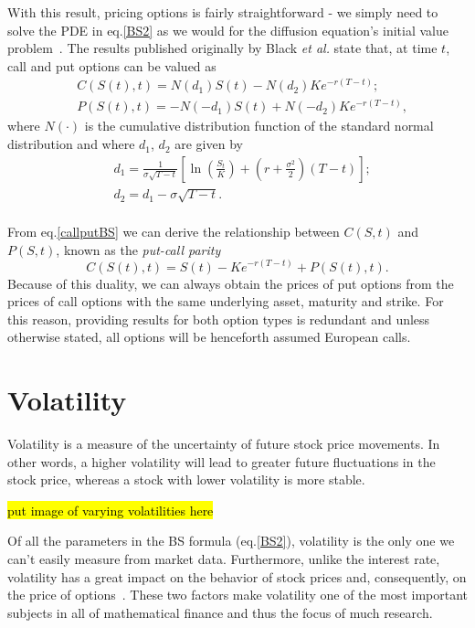 With this result, pricing options is fairly straightforward - we simply need to solve the PDE in eq.\eqref{BS2} as we would for the diffusion equation's initial value problem~\cite{Dilao}.
The results published originally by Black \textit{et al.} state that, at time $t$, call and put options can be valued as
\begin{equation}\label{callputBS}
\begin{split}
&C(S(t),t)=N(d_1)S(t)-N(d_2)Ke^{-r(T-t)};\\
&P(S(t),t)=-N(-d_1)S(t)+N(-d_2)Ke^{-r(T-t)},
\end{split}
\end{equation}
\noindent where $N(\cdot)$ is the cumulative distribution function of the standard normal distribution and where $d_1$, $d_2$ are given by
\begin{equation}\label{d1d2}
\begin{split}
&d_1=\frac{1}{\sigma\sqrt{T-t}}\left[\ln\left(\frac{S_t}{K}\right)+\left(r+\frac{\sigma^2}{2}\right)(T - t)\right];\\
&d_2=d_1-\sigma\sqrt{T-t}.\\
\end{split}
\end{equation}



From eq.\eqref{callputBS} we can derive the relationship between $C(S,t)$ and $P(S,t)$, known as the \emph{put-call parity}
\begin{equation}
C(S(t),t)=S(t)-Ke^{-r(T-t)}+P(S(t),t).
\end{equation}
\noindent Because of this duality, we can always obtain the prices of put options from the prices of call options with the same underlying asset, maturity and strike. For this reason, providing results for both option types is redundant and unless otherwise stated, all options will be henceforth assumed European calls.


\section{Volatility}
\label{section:volatility}
Volatility is a measure of the uncertainty of future stock price movements. In other words, a higher volatility will lead to greater future fluctuations in the stock price, whereas a stock with lower volatility is more stable.

\hl{put image of varying volatilities here}

Of all the parameters in the BS formula (eq.\eqref{BS2}), volatility is the only one we can't easily measure from market data.
Furthermore, unlike the interest rate, volatility has a great impact on the behavior of stock prices and, consequently, on the price of options~\cite{Wilmott3}.
These two factors make volatility one of the most important subjects in all of mathematical finance and thus the focus of much research.



